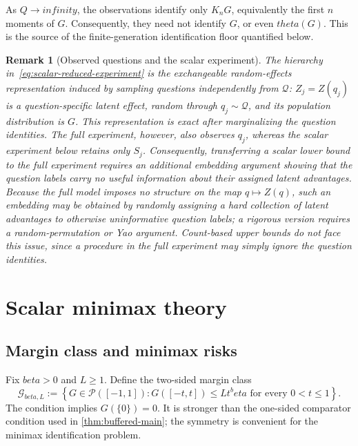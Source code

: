 \documentclass[11pt]{article}
\def\beta{beta}%
\def\theta{theta}%
\def\infty{infinity}%
\newtheorem{remark}[theorem]{Remark}
\newcommand{\calQ}{\mathcal Q}
\newcommand{\calG}{\mathcal G}
\newcommand\ced[1]{{\color{teal!70!black} #1}}
\begin{document}
As $Q\to\infty$, the observations identify only $K_nG$, equivalently the first $n$ moments of $G$. Consequently, they need not identify $G$, or even $\theta(G)$.  This is the  source of the finite-generation identification floor quantified below.

\begin{remark}[Observed questions and the scalar experiment]
\ced{The hierarchy in~\eqref{eq:scalar-reduced-experiment} is the exchangeable random-effects representation induced by sampling questions independently from $\calQ$: $Z_j=Z(q_j)$ is a question-specific latent effect, random through $q_j\sim\calQ$, and its population distribution is $G$.  This representation is exact after marginalizing the question identities.  The full experiment, however, also observes $q_j$, whereas the scalar experiment below retains only $S_j$.  Consequently, transferring a scalar lower bound to the full experiment requires an additional embedding argument showing that the question labels carry no useful information about their assigned latent advantages.  Because the full model imposes no structure on the map $q\mapsto Z(q)$, such an embedding may be obtained by randomly assigning a hard collection of latent advantages to otherwise uninformative question labels; a rigorous version requires a random-permutation or Yao argument.  Count-based upper bounds do not face this issue, since a procedure in the full experiment may simply ignore the question identities.}
\end{remark}

\section{Scalar minimax theory}
\label{sec:scalar-minimax}

\subsection{Margin class and minimax risks}

Fix $\beta>0$ and $L\ge1$.  Define the two-sided margin class
\begin{equation}
\label{eq:Gclass}
\calG_{\beta,L}
:=
\left\{
G\in\mathcal P([-1,1]):
G([-t,t])\le Lt^\beta
\text{ for every }0<t\le1
\right\}.
\end{equation}
The condition implies $G(\{0\})=0$.  It is stronger than the one-sided comparator condition used in \cref{thm:buffered-main}; the symmetry is convenient for the minimax identification problem.
\end{document}

